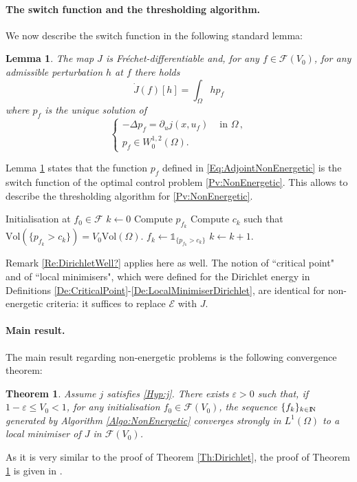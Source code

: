 \documentclass{article}
\newcommand{\N}{\textnormal{I\kern-0.21emN}}
\renewcommand{\leq}{\leqslant}
\def\e{{\varepsilon}}
\newtheorem{theorem}{Theorem}\renewcommand\thetheorem{\Roman{theorem}}
\newtheorem{lemma}[material]{Lemma}
\def\O{{\Omega}}
\numberwithin{equation}{section}
\begin{document}
\paragraph{The switch function and the thresholding algorithm.}
We now describe the switch function in the following standard lemma:
\begin{lemma}\label{Le:SwitchNonEnergetic}
The map $J$ is Fr\'echet-differentiable and, for any $f\in \mathcal F(V_0)$, for any admissible perturbation $h$ at $f$ there holds
\[ \dot J(f)[h]=\int_\O h p_f\]where $p_f$ is the unique solution of \begin{equation}\label{Eq:AdjointNonEnergetic}\begin{cases}-\Delta p_f=\partial_u j(x,u_f)&\text{ in }\O\,, 
\\ p_f\in W^{1,2}_0(\O).
\end{cases}
\end{equation}
\end{lemma}
Lemma \ref{Le:SwitchNonEnergetic} states that  the function $p_f$ defined in \eqref{Eq:AdjointNonEnergetic} is the switch function of the optimal control problem \eqref{Pv:NonEnergetic}. 
This allows to describe the thresholding algorithm for \eqref{Pv:NonEnergetic}.



\begin{algorithm}[H]
\caption{Thresholding algorithm for non-energetic problems eigenvalue}\label{Algo:NonEnergetic}
\begin{algorithmic}[1]
\State Initialisation at $f_0\in \mathcal F$
\State $k\gets 0$
\State Compute $p_{f_k}$
\State Compute $c_k$ such that $\mathrm{Vol}(\{p_{f_k}>c_k\})=V_0\mathrm{Vol}(\O)$.
\State $f_k\gets \mathds 1_{\{p_{f_k}>c_k\}}$
\State $k\gets k+1$.
\end{algorithmic}
\end{algorithm}
Remark \ref{Re:DirichletWell?} applies here as well.
The notion of ``critical point" and of ``local minimisers", which were defined for the Dirichlet energy in Definitions \ref{De:CriticalPoint}-\ref{De:LocalMinimiserDirichlet}, are identical for non-energetic criteria: it suffices to replace  $\mathscr E$ with $J$.

\paragraph{Main result.} The main result regarding non-energetic problems is the following convergence theorem:
\begin{theorem}\label{Th:NonEnergetic}
Assume $j$ satisfies \eqref{Hyp:j}. There exists $\e>0$ such that, if $1-\e\leq V_0<1$, for any initialisation $f_0\in \mathcal F(V_0)$, the sequence $\{f_k\}_{k\in \N}$ generated by Algorithm \ref{Algo:NonEnergetic} converges strongly in $L^1(\O)$ to a local minimiser of $J$ in $\mathcal F(V_0)$.
\end{theorem}
As it is very similar to the proof of Theorem \ref{Th:Dirichlet}, the proof of Theorem \ref{Th:NonEnergetic} is given in \cite[Section B]{CMFPSP}.
\end{document}
